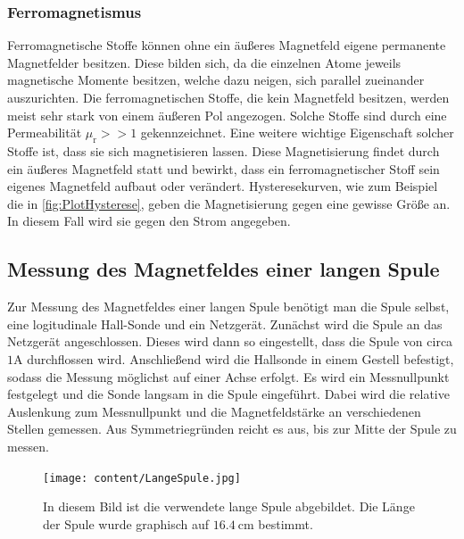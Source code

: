 \subsubsection{Ferromagnetismus}
\label{subsubsec:FERRO}
Ferromagnetische Stoffe können ohne ein äußeres Magnetfeld eigene permanente Magnetfelder besitzen. Diese bilden sich, da die einzelnen Atome jeweils magnetische Momente besitzen, welche 
dazu neigen, sich parallel zueinander auszurichten. Die ferromagnetischen Stoffe, die kein Magnetfeld besitzen, werden meist sehr stark von einem äußeren Pol angezogen. Solche Stoffe 
sind durch eine Permeabilität $\mu_{\text{r}} >> 1$ gekennzeichnet. Eine weitere wichtige Eigenschaft solcher Stoffe ist, dass sie sich magnetisieren lassen. Diese Magnetisierung findet
durch ein äußeres Magnetfeld statt und bewirkt, dass ein ferromagnetischer Stoff sein eigenes Magnetfeld aufbaut oder verändert. Hysteresekurven, wie zum Beispiel die in \autoref{fig:PlotHysterese},
geben die Magnetisierung gegen eine gewisse Größe an. In diesem Fall wird sie gegen den Strom angegeben.
\subsection{Messung des Magnetfeldes einer langen Spule}
\label{subsec:D_Lange_Spule}
Zur Messung des Magnetfeldes einer langen Spule benötigt man die Spule selbst, eine logitudinale Hall-Sonde und ein Netzgerät. Zunächst wird die Spule an das Netzgerät angeschlossen.
Dieses wird dann so eingestellt, dass die Spule von circa $1 \unit{\ampere}$ durchflossen wird. Anschließend wird die Hallsonde in einem Gestell befestigt, sodass die Messung 
möglichst auf einer Achse erfolgt.
Es wird ein Messnullpunkt festgelegt und die Sonde langsam in die Spule eingeführt. Dabei wird die relative Auslenkung zum Messnullpunkt und die Magnetfeldstärke 
an verschiedenen Stellen gemessen. Aus Symmetriegründen reicht es aus, bis zur Mitte der Spule zu messen.
\begin{figure}
    \centering
    \caption{In diesem Bild ist die verwendete lange Spule abgebildet. Die Länge der Spule wurde graphisch auf $16.4 \: \unit{\centi\metre}$ bestimmt.}
    \label{fig:Aufbau_lange_Spule}
    \texttt{[image: content/LangeSpule.jpg]}
\end{figure}
